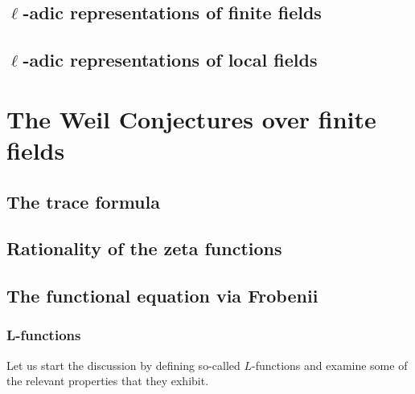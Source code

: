         \subsection{\texorpdfstring{$\ell$}{}-adic representations of finite fields}
        
        \subsection{\texorpdfstring{$\ell$}{}-adic representations of local fields}
    
    \section{The Weil Conjectures over finite fields}
        \subsection{The trace formula}
    
        \subsection{Rationality of the zeta functions}
        
        \subsection{The functional equation via Frobenii}
            \subsubsection{L-functions}
                Let us start the discussion by defining so-called $L$-functions  and examine some of the relevant properties that they exhibit. 
                    
